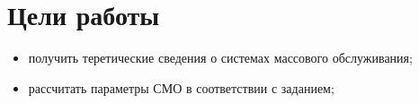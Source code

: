 \section{Цели работы}
\begin{itemize}
\item получить теретические сведения о системах массового обслуживания;
\item рассчитать параметры СМО в соответствии с заданием;
\end{itemize}